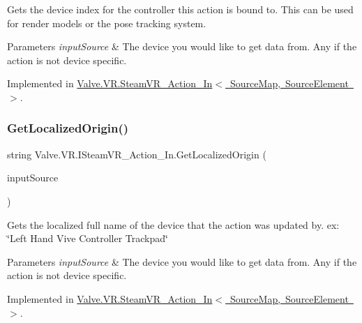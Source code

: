 Gets the device index for the controller this action is bound to. This can be used for render models or the pose tracking system. 


\begin{DoxyParams}{Parameters}
{\em input\+Source} & The device you would like to get data from. Any if the action is not device specific.\\
\hline
\end{DoxyParams}


Implemented in \mbox{\hyperlink{class_valve_1_1_v_r_1_1_steam_v_r___action___in_a21f1b8a683a6950f2e2cd1a2bbe42acc}{Valve.\+V\+R.\+Steam\+V\+R\+\_\+\+Action\+\_\+\+In$<$ Source\+Map, Source\+Element $>$}}.

\mbox{\label{interface_valve_1_1_v_r_1_1_i_steam_v_r___action___in_a13a0e2e6f5ceb7ea67542364e203b383}} 
\subsubsection{\texorpdfstring{GetLocalizedOrigin()}{GetLocalizedOrigin()}}
{\footnotesize\ttfamily string Valve.\+V\+R.\+I\+Steam\+V\+R\+\_\+\+Action\+\_\+\+In.\+Get\+Localized\+Origin (\begin{DoxyParamCaption}\item[{\mbox{\hyperlink{namespace_valve_1_1_v_r_a82e5bf501cc3aa155444ee3f0662853f}{Steam\+V\+R\+\_\+\+Input\+\_\+\+Sources}}}]{input\+Source }\end{DoxyParamCaption})}



Gets the localized full name of the device that the action was updated by. ex\+: \char`\"{}\+Left Hand Vive Controller Trackpad\char`\"{} 


\begin{DoxyParams}{Parameters}
{\em input\+Source} & The device you would like to get data from. Any if the action is not device specific.\\
\hline
\end{DoxyParams}


Implemented in \mbox{\hyperlink{class_valve_1_1_v_r_1_1_steam_v_r___action___in_a330a9cf6a0b63e08804318d49e43509e}{Valve.\+V\+R.\+Steam\+V\+R\+\_\+\+Action\+\_\+\+In$<$ Source\+Map, Source\+Element $>$}}.

